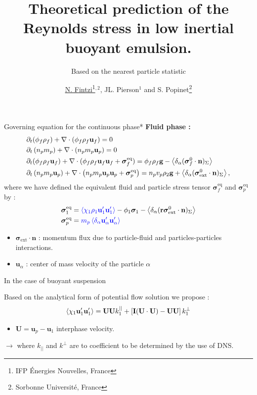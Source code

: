 \documentclass{sintefbeamer}
\title{Theoretical prediction of the Reynolds stress in low inertial buoyant emulsion.}
\subtitle{Based on the nearest particle statistic}
\author{\href{http://basilisk.fr/sandbox/fintzin/Rising-Suspenion/RS.c}{\underline{N. Fintzi}\footnote{IFP \'Energies Nouvelles, France}$^{,2}$}, JL. Pierson$^1$ and S. Popinet\footnote{Sorbonne Universit\'e, France}}
\begin{document}
\maketitle

\begin{frame}
  {Governing equation for the continuous phase}*
  \small
  \textbf{Fluid phase :}
  \begin{align*}
    &\partial_t (\phi_f \rho_f)  
    + \mathbf{\nabla}\cdot (
        \phi_f \rho_f\textbf{u}_f
    )
    = 
    0\\
    &\partial_t \left(n_p m_p\right)
    + \mathbf{\nabla}\cdot \left(n_pm_p\textbf{u}_p
    \right)
    = 
    0\\
    &\partial_t (\phi_f \rho_f\textbf{u}_f)  
    + \mathbf{\nabla}\cdot (
        \phi_f \rho_f\textbf{u}_f\textbf{u}_f
        + \bm{\sigma}_f^\text{eq}
    )
    = 
    \phi_f \rho_f \textbf{g} 
    - \left<\delta_\alpha ( {\bm{\sigma}_f^0 \cdot \textbf{n}} )_{\Sigma}\right>\\
    &\partial_t \left(n_p m_p \textbf{u}_p\right)
    + \mathbf{\nabla}\cdot \left(n_p
    m_p \textbf{u}_p \textbf{u}_p 
    + \bm{\sigma}_p^\text{eq}
    \right)
    = 
    n_p v_p \rho_2 \textbf{g}
    + \left<\delta_\alpha ( {\bm{\sigma}_\text{ext}^0 \cdot \textbf{n}} )_{\Sigma}\right>,
\end{align*} 
where we have defined the equivalent fluid and particle stress tensor $\bm{\sigma}_f^\text{eq}$ and $\bm{\sigma}_p^\text{eq}$ by : 
\begin{align*}
    &\bm{\sigma}_1^\text{eq}
    = 
    \tb{\avg{\chi_1\rho_1\textbf{u}_1'\textbf{u}_1'}}
    - \phi_1 \bm{\sigma}_1%
    - \pSavg{{\textbf{r}\bm{\sigma}_\text{ext}^0 \cdot \textbf{n}}}\\
    &\bm{\sigma}_p^\text{eq}
    =  \tb{m_p\pavg{\textbf{u}_\alpha'\textbf{u}_\alpha'}}
\end{align*}
\begin{itemize}
  \item $\bm{\sigma}_\text{ext} \cdot \textbf{n}$ : momentum flux due to particle-fluid and particles-particles interactions. 
  \item $\textbf{u}_\alpha$ : center of mass velocity of the particle $\alpha$
\end{itemize}
\end{frame}

\begin{frame}
  {In the case of buoyant suspension}

  Based on the analytical form of potential flow solution we propose :
  \begin{equation*}
    \left<\chi_1 \textbf{u}_1'\textbf{u}_1'\right>
    = 
    \textbf{U}
    \textbf{U}
    k^{||}_1
    + 
    \left[
        \textbf{I} (\textbf{U}\cdot \textbf{U})
    -
    \textbf{U}
    \textbf{U}
    \right]
    k^{\bot}_1
\end{equation*}
\begin{itemize}
  \item $\textbf{U} = \textbf{u}_p - \textbf{u}_1$ interphase velocity. 
\end{itemize}
$\to$ where $k_{||}$ and $k^\bot$ are to coefficient to be determined by the use of DNS. 
\end{frame}
\end{document}
